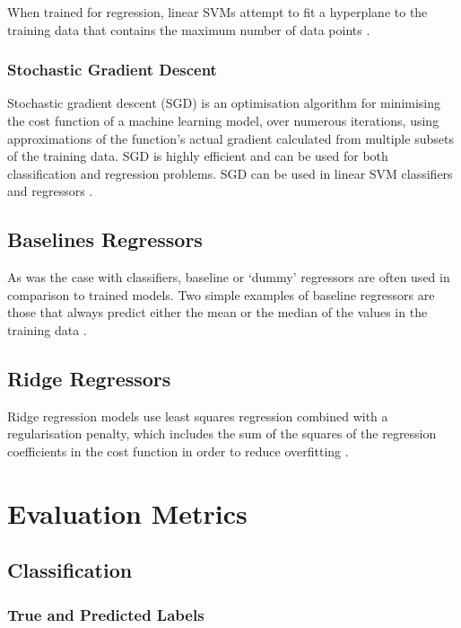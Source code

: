 When trained for regression, linear SVMs attempt to fit a hyperplane to the training data that contains the maximum number of data points \cite{smola2004tutorial}.

\subsubsection{Stochastic Gradient Descent}

Stochastic gradient descent (SGD) is an optimisation algorithm for minimising the cost function of a machine learning model, over numerous iterations, using approximations of the function's actual gradient calculated from multiple subsets of the training data. SGD is highly efficient and can be used for both classification and regression problems. SGD can be used in linear SVM classifiers and regressors \cite{pedregosa2011scikit}.

\subsection{Baselines Regressors}

As was the case with classifiers, baseline or `dummy' regressors are often used in comparison to trained models. Two simple examples of baseline regressors are those that always predict either the mean or the median of the values in the training data \cite{pedregosa2011scikit}.

\subsection{Ridge Regressors}

Ridge regression models use least squares regression combined with a regularisation penalty, which includes the sum of the squares of the regression coefficients in the cost function in order to reduce overfitting \cite{dangeti2017statistics}.

\section{Evaluation Metrics}

\subsection{Classification}

\subsubsection{True and Predicted Labels}

